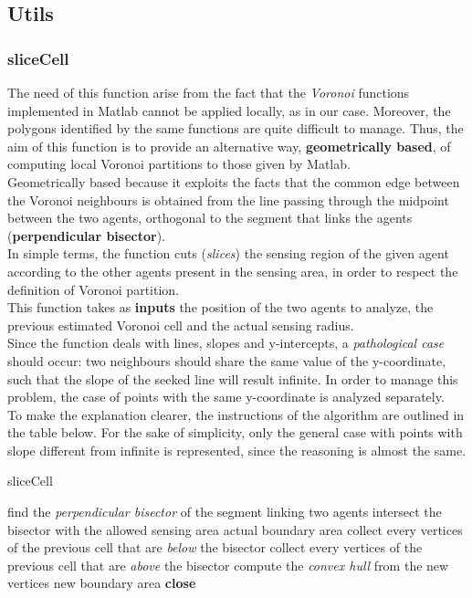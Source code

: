 \documentclass[a4paper,11pt,oneside]{book}
\begin{document}
\subsection{Utils}
\subsubsection{sliceCell}
	The need of this function arise from the fact that the \emph{Voronoi} functions implemented in Matlab cannot be applied locally, as in our case. Moreover, the polygons identified by the same functions are quite difficult to manage. Thus, the aim of this function is to provide an alternative way, \textbf{geometrically based}, of computing local Voronoi partitions to those given by Matlab.\\
	Geometrically based because it exploits the facts that the common edge between the Voronoi neighbours is obtained from the line passing through the midpoint between the two agents, orthogonal to the segment that links the agents (\textbf{perpendicular bisector}).\\
	In simple terms, the function cuts (\emph{slices}) the sensing region of the given agent according to the other agents present in the sensing area, in order to respect the definition of Voronoi partition.\\
	This function takes as \textbf{inputs} the position of the two agents to analyze, the previous estimated Voronoi cell and the actual sensing radius.\\
	Since the function deals with lines, slopes and y-intercepts, a \emph{pathological case} should occur: two neighbours should share the same value of the y-coordinate, such that the slope of the seeked line will result infinite. In order to manage this problem, the case of points with the same y-coordinate is analyzed separately.\\
	To make the explanation clearer, the instructions of the algorithm are outlined in the table below. For the sake of simplicity, only the general case with points with slope different from infinite is represented, since the reasoning is almost the same.
	
\begin{algorithm}[H]
\caption{sliceCell}\label{euclid}
\begin{algorithmic}[1]
\State find the \emph{perpendicular bisector} of the segment linking two agents
\State intersect the bisector with the allowed sensing area
\State \Return actual boundary area
\Else
	\State collect every vertices of the previous cell that are \emph{below} the bisector
	\Else
	\State collect every vertices of the previous cell that are \emph{above} the bisector
	\EndIf
\EndIf
\State compute the \emph{convex hull} from the new vertices
\State \Return new boundary area
\State \textbf{close}
\end{algorithmic}
\end{algorithm}	
\end{document}
